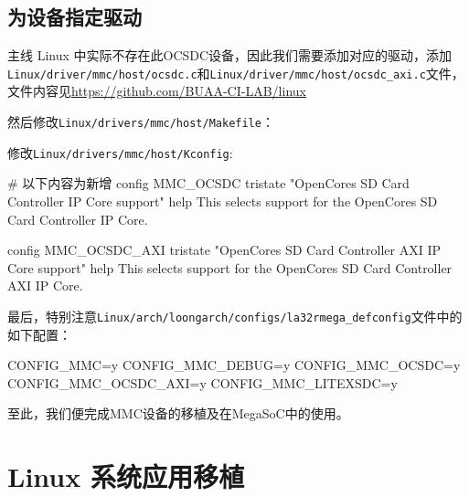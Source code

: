 \subsection{为设备指定驱动}\label{sec:07-soc-and-system-007}

主线 Linux 中实际不存在此OCSDC设备，因此我们需要添加对应的驱动，添加\texttt{Linux/driver/mmc/host/ocsdc.c}和\texttt{Linux/driver/mmc/host/ocsdc\_axi.c}文件，文件内容见\url{https://github.com/BUAA-CI-LAB/linux}

然后修改\texttt{Linux/drivers/mmc/host/Makefile}：


修改\texttt{Linux/drivers/mmc/host/Kconfig}:

\begin{CodeBlock}[language=BookConfig]
# 以下内容为新增
config MMC_OCSDC
        tristate "OpenCores SD Card Controller IP Core support"
        help
          This selects support for the OpenCores SD Card Controller 
          IP Core.

config MMC_OCSDC_AXI
        tristate "OpenCores SD Card Controller AXI IP Core support"
        help
          This selects support for the OpenCores SD Card Controller 
          AXI IP Core.
\end{CodeBlock}

最后，特别注意\texttt{Linux/arch/loongarch/configs/la32rmega\_defconfig}文件中的如下配置：

\begin{CodeBlock}[language=BookConfig]
CONFIG_MMC=y
CONFIG_MMC_DEBUG=y
CONFIG_MMC_OCSDC=y
CONFIG_MMC_OCSDC_AXI=y
CONFIG_MMC_LITEXSDC=y
\end{CodeBlock}

至此，我们便完成MMC设备的移植及在MegaSoC中的使用。

\section{Linux 系统应用移植}\label{sec:07-soc-and-system-008}

